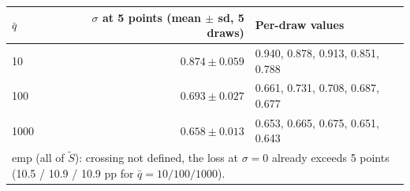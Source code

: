 \begin{tabular}{lrl}
\toprule
$\bar q$ & $\sigma$ at 5 points (mean $\pm$ sd, 5 draws) & Per-draw values \\
\midrule
10 & $0.874 \pm 0.059$ & 0.940, 0.878, 0.913, 0.851, 0.788 \\
100 & $0.693 \pm 0.027$ & 0.661, 0.731, 0.708, 0.687, 0.677 \\
1000 & $0.658 \pm 0.013$ & 0.653, 0.665, 0.675, 0.651, 0.643 \\
\midrule
\multicolumn{3}{p{0.92\linewidth}}{\footnotesize emp (all of $\tilde S$): crossing not defined, the loss at $\sigma=0$ already exceeds 5 points (10.5 / 10.9 / 10.9 pp for $\bar q=10/100/1000$).} \\
\bottomrule
\end{tabular}
